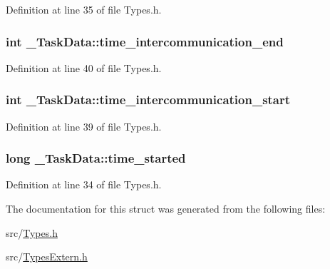Definition at line 35 of file Types.\+h.

\hypertarget{struct___task_data_a67f91b17345e5d837d53f13561f52d5a}{}
\subsubsection[{time\+\_\+intercommunication\+\_\+end}]{\setlength{\rightskip}{0pt plus 5cm}int \+\_\+\+Task\+Data\+::time\+\_\+intercommunication\+\_\+end}\label{struct___task_data_a67f91b17345e5d837d53f13561f52d5a}


Definition at line 40 of file Types.\+h.

\hypertarget{struct___task_data_adb747fb823315a3d5cd6d2837dda7acf}{}
\subsubsection[{time\+\_\+intercommunication\+\_\+start}]{\setlength{\rightskip}{0pt plus 5cm}int \+\_\+\+Task\+Data\+::time\+\_\+intercommunication\+\_\+start}\label{struct___task_data_adb747fb823315a3d5cd6d2837dda7acf}


Definition at line 39 of file Types.\+h.

\hypertarget{struct___task_data_ab9e518445c80c9c67b60c1c69cbababb}{}
\subsubsection[{time\+\_\+started}]{\setlength{\rightskip}{0pt plus 5cm}long \+\_\+\+Task\+Data\+::time\+\_\+started}\label{struct___task_data_ab9e518445c80c9c67b60c1c69cbababb}


Definition at line 34 of file Types.\+h.



The documentation for this struct was generated from the following files\+:\begin{DoxyCompactItemize}
\item 
src/\hyperlink{_types_8h}{Types.\+h}\item 
src/\hyperlink{_types_extern_8h}{Types\+Extern.\+h}\end{DoxyCompactItemize}
